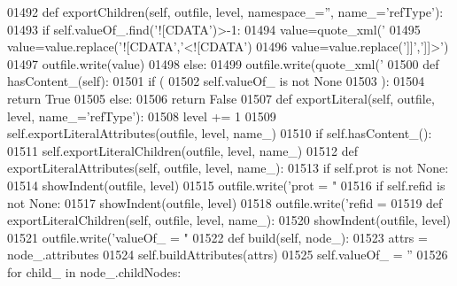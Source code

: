 \begin{DoxyCode}
{{{{{{{{{{{{{{{{{{{{{{{{{{{{{{{{{{{{{{{{{{{{{{{{{{{{{{{{{{{{{{{{{{{{{{{{{{{{{{{{{{{{{{{{{{{{01492     \textcolor{keyword}{def }exportChildren(self, outfile, level, namespace\_='', name\_='refType'):
01493         \textcolor{keywordflow}{if} self.valueOf\_.find(\textcolor{stringliteral}{'![CDATA'})>-1:
01494             value=quote_xml(\textcolor{stringliteral}{'%
01495             value=value.replace(\textcolor{stringliteral}{'![CDATA'},\textcolor{stringliteral}{'<![CDATA'})
01496             value=value.replace(\textcolor{stringliteral}{']]'},\textcolor{stringliteral}{']]>'})
01497             outfile.write(value)
01498         \textcolor{keywordflow}{else}:
01499             outfile.write(quote_xml(\textcolor{stringliteral}{'%
01500     \textcolor{keyword}{def }hasContent_(self):
01501         \textcolor{keywordflow}{if} (
01502             self.valueOf_ \textcolor{keywordflow}{is} \textcolor{keywordflow}{not} \textcolor{keywordtype}{None}
01503             ):
01504             \textcolor{keywordflow}{return} \textcolor{keyword}{True}
01505         \textcolor{keywordflow}{else}:
01506             \textcolor{keywordflow}{return} \textcolor{keyword}{False}
01507     \textcolor{keyword}{def }exportLiteral(self, outfile, level, name\_='refType'):
01508         level += 1
01509         self.exportLiteralAttributes(outfile, level, name\_)
01510         \textcolor{keywordflow}{if} self.hasContent_():
01511             self.exportLiteralChildren(outfile, level, name\_)
01512     \textcolor{keyword}{def }exportLiteralAttributes(self, outfile, level, name\_):
01513         \textcolor{keywordflow}{if} self.prot \textcolor{keywordflow}{is} \textcolor{keywordflow}{not} \textcolor{keywordtype}{None}:
01514             showIndent(outfile, level)
01515             outfile.write(\textcolor{stringliteral}{'prot = "%
01516         \textcolor{keywordflow}{if} self.refid \textcolor{keywordflow}{is} \textcolor{keywordflow}{not} \textcolor{keywordtype}{None}:
01517             showIndent(outfile, level)
01518             outfile.write(\textcolor{stringliteral}{'refid = %
01519     \textcolor{keyword}{def }exportLiteralChildren(self, outfile, level, name\_):
01520         showIndent(outfile, level)
01521         outfile.write(\textcolor{stringliteral}{'valueOf\_ = "%
01522     \textcolor{keyword}{def }build(self, node\_):
01523         attrs = node\_.attributes
01524         self.buildAttributes(attrs)
01525         self.valueOf_ = \textcolor{stringliteral}{''}
01526         \textcolor{keywordflow}{for} child\_ \textcolor{keywordflow}{in} node\_.childNodes:
}}}}}}}}}}}}}}}}}}}}}}}}}}}}}}}}}}}}}}}}}}}}}}}}}}}}}}}}}}}}}}}}}}}}}}}}}}}}}}}}}}}}}}}}}}}}}}}}}
\end{DoxyCode}
